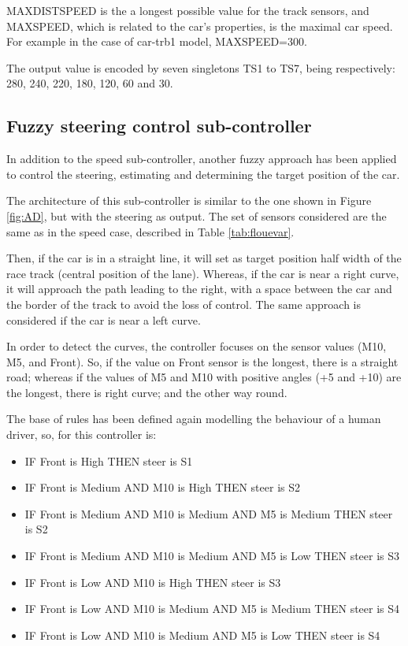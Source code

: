 \documentclass[runningheads,a4paper]{llncs}
\begin{document}
MAXDISTSPEED is the a longest possible value for the track sensors, and MAXSPEED, which is related to the car's properties, is the maximal car speed. For example in the case of car-trb1 model, MAXSPEED=300.

The output value is encoded by seven singletons TS1 to TS7, being respectively: 280, 240, 220, 180, 120, 60 and 30.


\subsection{Fuzzy steering control sub-controller}	

In addition to the speed sub-controller, another fuzzy approach has been applied to control the steering, estimating and determining the target position of the car. 

The architecture of this sub-controller is similar to the one shown in Figure \ref{fig:AD}, but with the steering as output. The set of sensors considered are the same as in the speed case, described in Table \ref{tab:flouevar}.

Then, if the car is in a straight line, it will set as target position half width of the race track (central position of the lane).	Whereas, if the car is near a right curve, it will approach the path leading to the right, with a space between the car and the border of the track to avoid the loss of control. The same approach is considered if the car is near a left curve.

In order to detect the curves, the controller focuses on the sensor values (M10, M5, and Front). So, if the value on Front sensor is the longest, there is a straight road; whereas if the values of M5 and M10 with positive angles (+5 and +10) are the longest, there is right curve; and the other way round.

The base of rules has been defined again modelling the behaviour of a human driver, so, for this controller is:

\begin{itemize}		
	\item IF Front is High THEN steer is S1
	\item IF Front is Medium AND M10 is High THEN  steer is S2
	\item IF Front is Medium AND M10 is Medium AND M5 is Medium THEN steer is S2
	\item IF Front is Medium AND M10 is Medium AND M5 is Low THEN steer is S3
	\item IF Front is Low AND M10 is High THEN steer is S3
	\item IF Front is Low AND M10 is Medium AND M5 is Medium THEN steer is S4
	\item IF Front is Low AND M10 is Medium AND M5 is Low THEN steer is S4
\end{itemize}	
\end{document}

